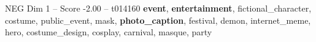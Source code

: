 \begin{textsample}{NEG Dim 1 – Score -2.00 – t014160}  \label{ex:f1_neg_002}
\textbf{event}, \textbf{entertainment}, fictional\_character, costume, public\_event, mask, \textbf{photo\_caption}, festival, demon, internet\_meme, hero, costume\_design, cosplay, carnival, masque, party

\end{textsample}
